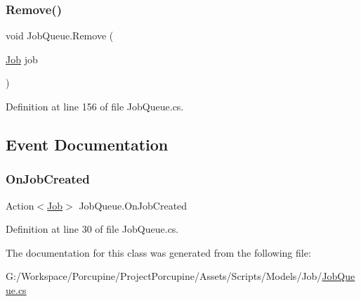 \subsubsection{\texorpdfstring{Remove()}{Remove()}}
{\footnotesize\ttfamily void Job\+Queue.\+Remove (\begin{DoxyParamCaption}\item[{\hyperlink{class_job}{Job}}]{job }\end{DoxyParamCaption})}



Definition at line 156 of file Job\+Queue.\+cs.



\subsection{Event Documentation}
\mbox{\label{class_job_queue_a9b7c35beb78b53bd8ae67b699e0758d9}} 
\subsubsection{\texorpdfstring{On\+Job\+Created}{OnJobCreated}}
{\footnotesize\ttfamily Action$<$\hyperlink{class_job}{Job}$>$ Job\+Queue.\+On\+Job\+Created}



Definition at line 30 of file Job\+Queue.\+cs.



The documentation for this class was generated from the following file\+:\begin{DoxyCompactItemize}
\item 
G\+:/\+Workspace/\+Porcupine/\+Project\+Porcupine/\+Assets/\+Scripts/\+Models/\+Job/\hyperlink{_job_queue_8cs}{Job\+Queue.\+cs}\end{DoxyCompactItemize}
